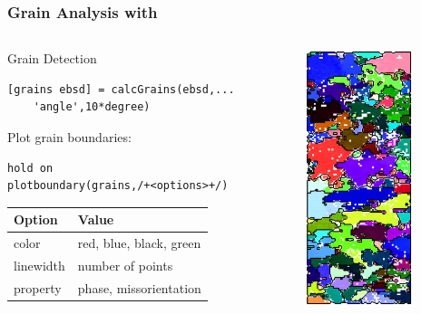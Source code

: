 \begin{frame}[fragile]
  \frametitle{Grain Analysis with \mtex}

  \begin{columns}
    \begin{column}{8.5cm}

      \medskip

      Grain Detection

\begin{lstlisting}
[grains ebsd] = calcGrains(ebsd,...
    'angle',10*degree)
\end{lstlisting}


\medskip

Plot grain boundaries:
\begin{lstlisting}
hold on
plotboundary(grains,/+<options>+/)
\end{lstlisting}

\begin{tabular}{ll}
  Option & Value \\
  \toprule
  color & red, blue, black, green\\
  linewidth & number of points\\
  property & phase, missorientation\\
\end{tabular}

\end{column}
    \begin{column}{3.5cm}
      \includegraphics[height=7.5cm]{pic/ebsdgrains}
    \end{column}
  \end{columns}

\end{frame}


